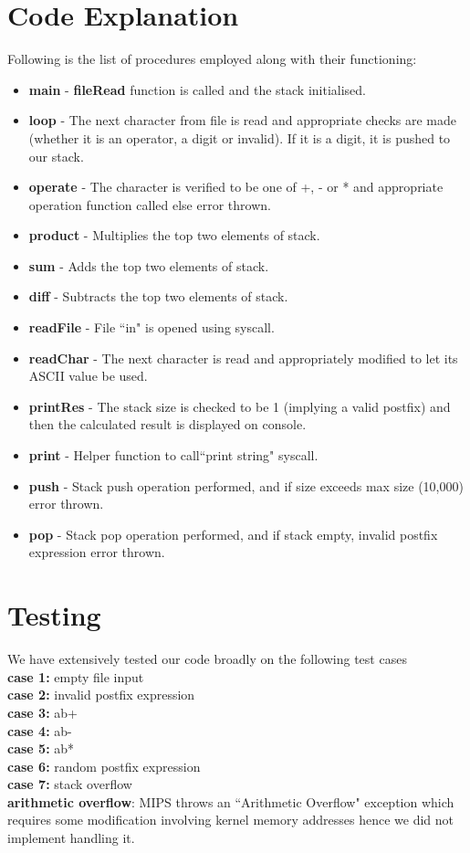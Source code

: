 \documentclass{article}
\begin{document}
\section*{Code Explanation}
Following is the list of procedures employed along with their functioning:
\begin{itemize}
    \item \textbf{main} - \textbf{fileRead} function is called and the stack initialised.
    \item \textbf{loop} - The next character from file is read and appropriate checks are made (whether it is an operator, a digit or invalid). If it is a digit, it is pushed to our stack.
    \item \textbf{operate} - The character is verified to be one of +, - or * and appropriate operation function called else error thrown.
    \item \textbf{product} - Multiplies the top two elements of stack.
    \item \textbf{sum} - Adds the top two elements of stack.
    \item \textbf{diff} - Subtracts the top two elements of stack.
    \item \textbf{readFile} - File ``in" is opened using syscall.
    \item \textbf{readChar} - The next character is read and appropriately modified to let its ASCII value be used.
    \item \textbf{printRes} - The stack size is checked to be 1 (implying a valid postfix) and then the calculated result is displayed on console.
    \item \textbf{print} - Helper function to call``print string" syscall.
    \item \textbf{push} - Stack push operation performed, and if size exceeds max size (10,000) error thrown.
    \item \textbf{pop} - Stack pop operation performed, and if stack empty, invalid postfix expression error thrown.
\end{itemize}

\section*{Testing}
We have extensively tested our code broadly on the following test cases \\
\textbf{case 1:} empty file input \\
\textbf{case 2:} invalid postfix expression \\
\textbf{case 3:} ab+ \\
\textbf{case 4:} ab- \\
\textbf{case 5:} ab* \\
\textbf{case 6:} random postfix expression \\
\textbf{case 7:} stack overflow \\
\textbf{arithmetic overflow}: MIPS throws an ``Arithmetic Overflow" exception which requires some modification involving kernel memory addresses hence we did not implement handling it.
\end{document}
